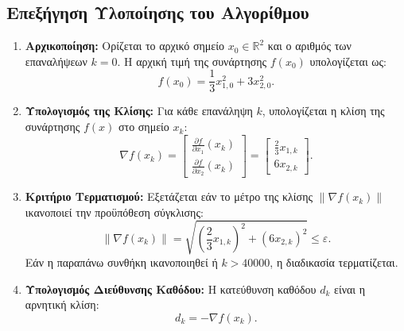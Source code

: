 \documentclass[a4paper,12pt]{report}
\begin{document}
\subsection*{Eπεξήγηση Υλοποίησης του Αλγορίθμου}
\begin{enumerate}
    \item \textbf{Αρχικοποίηση:} Ορίζεται το αρχικό σημείο \(x_0 \in \mathbb{R}^2\) και ο αριθμός των επαναλήψεων \(k = 0\). Η αρχική τιμή της συνάρτησης \(f(x_0)\) υπολογίζεται ως:
    \[
    f(x_0) = \frac{1}{3}x_{1,0}^2 + 3x_{2,0}^2.
    \]

    \item \textbf{Υπολογισμός της Κλίσης:} Για κάθε επανάληψη \(k\), υπολογίζεται η κλίση της συνάρτησης \(f(x)\) στο σημείο \(x_k\):
    \[
    \nabla f(x_k) = \begin{bmatrix} \frac{\partial f}{\partial x_1}(x_k) \\ \frac{\partial f}{\partial x_2}(x_k) \end{bmatrix} = \begin{bmatrix} \frac{2}{3}x_{1,k} \\ 6x_{2,k} \end{bmatrix}.
    \]

    \item \textbf{Κριτήριο Τερματισμού:} Εξετάζεται εάν το μέτρο της κλίσης \(\|\nabla f(x_k)\|\) ικανοποιεί την προϋπόθεση σύγκλισης:
    \[
    \|\nabla f(x_k)\| = \sqrt{\left(\frac{2}{3}x_{1,k}\right)^2 + (6x_{2,k})^2} \leq \varepsilon.
    \]
    Εάν η παραπάνω συνθήκη ικανοποιηθεί ή \(k > 40000\), η διαδικασία τερματίζεται.

    \item \textbf{Υπολογισμός Διεύθυνσης Καθόδου:} Η κατεύθυνση καθόδου \(d_k\) είναι η αρνητική κλίση:
    \[
    d_k = -\nabla f(x_k).
    \]


\end{enumerate}
\end{document}
